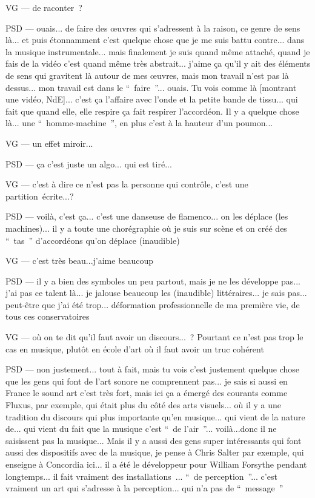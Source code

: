 VG — de raconter ?

PSD — ouais... de faire des œuvres qui s'adressent à la raison, ce genre de sens là... et puis étonnamment c'est quelque chose que je me suis battu contre... dans la musique instrumentale... mais finalement je suis quand même attaché, quand je fais de la vidéo c'est quand même très abstrait... j'aime ça qu'il y ait des éléments de sens qui gravitent là autour de mes œuvres, mais mon travail n'est pas là dessus... mon travail est dans le “ faire ”... ouais. Tu vois comme là [montrant une vidéo, NdE]... c'est ça l'affaire avec l'onde et la petite bande de tissu... qui fait que quand elle, elle respire ça fait respirer l'accordéon. Il y a quelque chose là... une “ homme-machine ”, en plus c'est à la hauteur d'un poumon...

VG — un effet miroir...

PSD — ça c'est juste un algo... qui est tiré...

VG — c'est à dire ce n'est pas la personne qui contrôle, c'est une partition écrite...?

PSD — voilà, c'est ça... c'est une danseuse de flamenco...  on les déplace (les machines)... il y a toute une chorégraphie où je suis sur scène et on créé des “ tas ” d'accordéons qu'on déplace (inaudible)

VG — c'est très beau...j'aime beaucoup

PSD — il y a bien des symboles un peu partout, mais je ne les développe pas... j'ai pas ce talent là... je jalouse beaucoup les (inaudible)  littéraires... je sais pas... peut-être que j'ai été trop... déformation professionnelle de ma première vie, de tous ces conservatoires

VG — où on te dit qu'il faut avoir un discours... ? Pourtant ce n'est pas trop le cas en musique, plutôt en école d'art où il faut avoir un truc cohérent

PSD — non justement... tout à fait, mais tu vois c'est justement quelque chose que les gens qui font de l'art sonore ne comprennent pas... je sais si aussi en France le sound art c'est très fort, mais ici ça a émergé des courants comme Fluxus, par exemple, qui était plus du côté des arts visuels... où il y a une tradition du discours qui plus importante qu'en musique... qui vient de la nature de... qui vient du fait que la musique c'est “ de l'air ”... voilà...donc  il ne saisissent pas la musique... Mais il y a aussi des gens super intéressants qui font aussi des dispositifs avec de la musique, je pense à Chris Salter par exemple, qui enseigne à Concordia ici... il a été le développeur pour William Forsythe pendant longtemps... il fait vraiment des installations ... “ de perception ”... c'est vraiment un art qui s'adresse à la  perception... qui n'a pas de “ message ”

